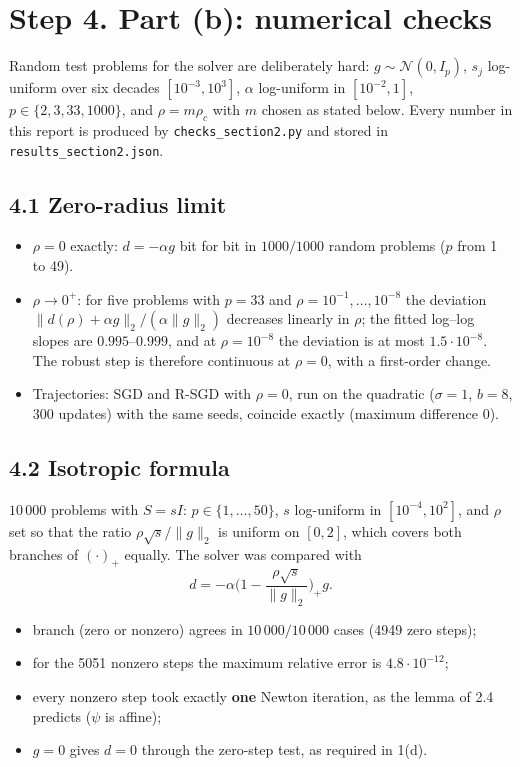 \documentclass[11pt,a4paper]{article}
\newcommand{\norm}[1]{\lVert #1\rVert_2}
\begin{document}
\section*{Step 4. Part (b): numerical checks}

Random test problems for the solver are deliberately hard: $g\sim\mathcal N(0,I_p)$,
$s_j$ log-uniform over six decades $[10^{-3},10^3]$, $\alpha$ log-uniform in
$[10^{-2},1]$, $p\in\{2,3,33,1000\}$, and $\rho=m\rho_c$ with $m$ chosen as stated
below. Every number in this report is produced by \texttt{checks\_section2.py} and
stored in \texttt{results\_section2.json}.

\subsection*{4.1 Zero-radius limit}
\begin{itemize}
\item $\rho=0$ exactly: $d=-\alpha g$ bit for bit in $1000/1000$ random problems
($p$ from 1 to 49).
\item $\rho\to0^+$: for five problems with $p=33$ and
$\rho=10^{-1},\dots,10^{-8}$ the deviation $\norm{d(\rho)+\alpha g}/(\alpha\norm g)$
decreases linearly in $\rho$; the fitted log--log slopes are $0.995$--$0.999$, and at
$\rho=10^{-8}$ the deviation is at most $1.5\cdot10^{-8}$. The robust step is
therefore continuous at $\rho=0$, with a first-order change.
\item Trajectories: SGD and R-SGD with $\rho=0$, run on the quadratic ($\sigma=1$,
$b=8$, 300 updates) with the same seeds, coincide exactly (maximum difference 0).
\end{itemize}

\subsection*{4.2 Isotropic formula}

$10\,000$ problems with $S=sI$: $p\in\{1,\dots,50\}$, $s$ log-uniform in
$[10^{-4},10^2]$, and $\rho$ set so that the ratio $\rho\sqrt s/\norm g$ is uniform on
$[0,2]$, which covers both branches of $(\cdot)_+$ equally. The solver was compared with
\begin{equation*}
d=-\alpha\Big(1-\frac{\rho\sqrt s}{\norm g}\Big)_+g .
\end{equation*}
\begin{itemize}
\item branch (zero or nonzero) agrees in $10\,000/10\,000$ cases (4949 zero steps);
\item for the 5051 nonzero steps the maximum relative error is $4.8\cdot10^{-12}$;
\item every nonzero step took exactly \textbf{one} Newton iteration, as the lemma of
2.4 predicts ($\psi$ is affine);
\item $g=0$ gives $d=0$ through the zero-step test, as required in 1(d).
\end{itemize}
\end{document}
